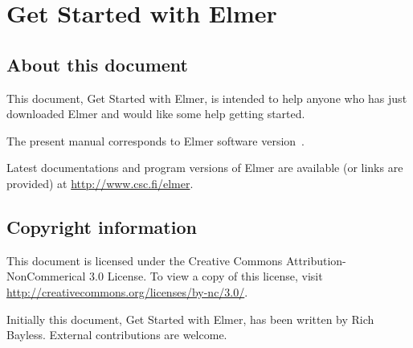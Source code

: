 \chapter*{Get Started with Elmer}

\section*{About this document}

This document, Get Started with Elmer, is intended to help
anyone who has just downloaded Elmer and would like some
help getting started. 


The present manual corresponds to Elmer software version~\elmerversion{}.

Latest documentations and program versions of Elmer are available (or links are provided) at 
\url{http://www.csc.fi/elmer}. 

\section*{Copyright information}

This document is licensed under the Creative Commons Attribution-NonCommerical 3.0 License. 
To view a copy of this license, visit \url{http://creativecommons.org/licenses/by-nc/3.0/}.

Initially this document, Get Started with Elmer, has been written by Rich Bayless.
External contributions are welcome.



